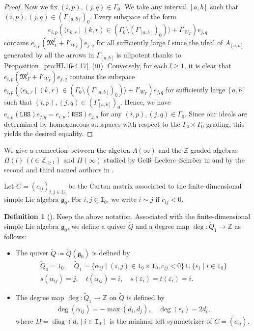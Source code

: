 \documentclass[12pt]{amsart}
\theoremstyle{definition}
\newtheorem{definition}[theorem]{Definition}
\theoremstyle{remark}
\numberwithin{equation}{section}
\newcommand{\diag}{\operatorname{diag}}
\begin{document}
\begin{proof}
Now we fix $(i,p), (j,q)\in\Gamma_0$. We take any interval $[a,b]$ such that $(i,p), (j,q) \in (\Gamma_{[a,b]}^{\circ})_0$. Every subspace of the form $$e_{i,p}(\langle e_{k,r} \mid (k,r)\in \left(\Gamma_0\setminus (\Gamma_{[a,b]}^{\circ})_0\right)\rangle+ I'_{W_{\Gamma}})e_{j,q}$$ contains $e_{i,p}(\mathfrak{M}_{\Gamma}^l+ I'_{W_{\Gamma}})e_{j,q}$ for all sufficiently large $l$ since the ideal of $A_{[a,b]}$ generated by all the arrows in $\Gamma_{[a,b]}^\circ$ is nilpotent thanks to Proposition~\ref{pro:HL16-4.17}~(iii). Conversely, for each $l\geq1$, it is clear that  $e_{i,p}(\mathfrak{M}_{\Gamma}^l+ I'_{W_{\Gamma}})e_{j,q}$ contains the subspace $e_{i,p}(\langle e_{k,r} \mid (k,r)\in \left(\Gamma_0\setminus (\Gamma_{[a,b]}^{\circ})_0\right)\rangle+ I'_{W_{\Gamma}})e_{j,q}$ for
sufficiently large $[a,b]$ such that $(i,p), (j,q)\in (\Gamma^\circ_{[a,b]})_0$. Hence, we have 
$e_{i,p}(\mathtt{LHS})e_{j,q}=e_{i,p}(\mathtt{RHS})e_{j,q}$ for any $(i,p), (j,q)\in\Gamma_0$. Since our ideals are determined by homogeneous subspaces with respect to the $\Gamma_0\times \Gamma_0$-grading, this yields the desired equality.  
\end{proof}

We give a connection between the algebra $\Lambda(\infty)$ and the $\mathbb{Z}$-graded algebras $\Pi(l)\,(l\in \mathbb Z_{\geq 1})$ and $\Pi(\infty)$ studied by Gei\ss--Leclerc--Schr\"oer in \cite{GLS-2017} and by the second and third named authors in \cite[\S\S4--5]{FM}.

Let $C = (c_{ij})_{i,j \in \mathtt{I}_0}$ be the Cartan matrix 
associated to the finite-dimensional simple Lie algebra $\mathfrak{g}_0$.
For $i,j\in \mathtt{I}_0$, we write $i\sim j$ if $c_{ij}<0$.

\begin{definition}[{\cite{GLS-2017,FM}}]\label{def:GLS1}
Keep the above notation. Associated with the finite-dimensional simple Lie algebra $\mathfrak{g}_0$, we define a quiver $\widetilde{Q}$ and a degree map $\deg \colon \widetilde{Q}_1 \to \mathbb{Z}$
as follows:
\begin{itemize}
    \item [(i)] The quiver $\widetilde{Q} \coloneqq \widetilde{Q}(\mathfrak{g}_0)$ is defined by
    \begin{gather*}
    \widetilde{Q}_0=\mathtt{I}_0, \quad \widetilde{Q}_1= \{ \alpha_{ij}\mid (i, j)\in \mathtt{I}_0 \times \mathtt{I}_0, c_{ij}<0\}\cup \{\varepsilon_i \mid i\in \mathtt{I}_0\}\\
s(\alpha_{ij})=j,\quad t(\alpha_{ij})=i,\quad s(\varepsilon_i)=t(\varepsilon_i)=i.
\end{gather*}
\item[(ii)] The degree map $\deg\colon \widetilde{Q}_1 \to \mathbb{Z}$  
on $\widetilde{Q}$ is defined by \begin{align*}
    \deg(\alpha_{ij})=-\mathop{\mathrm{max}}(d_i, d_j),\quad \deg(\varepsilon_i)=2d_i,
\end{align*}
where $D=\diag(d_i\mid i\in \mathtt{I}_0)$ is the minimal left symmetrizer of $C=(c_{ij})$.
\end{itemize}
\end{definition}
\end{document}
